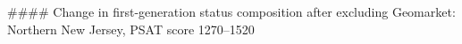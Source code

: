 #### Change in first-generation status composition after excluding Geomarket: Northern New Jersey, PSAT score 1270–1520
